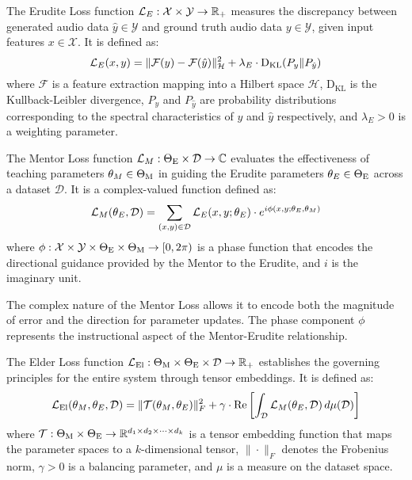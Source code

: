 \begin{definition}
The Erudite Loss function $\mathcal{L}_E: \mathcal{X} \times \mathcal{Y} \rightarrow \mathbb{R}_+$ measures the discrepancy between generated audio data $\hat{y} \in \mathcal{Y}$ and ground truth audio data $y \in \mathcal{Y}$, given input features $x \in \mathcal{X}$. It is defined as:
\begin{equation}
\mathcal{L}_E(x, y) = \| \mathcal{F}(y) - \mathcal{F}(\hat{y}) \|_{\mathcal{H}}^2 + \lambda_E \cdot \mathrm{D_{KL}}(P_y \| P_{\hat{y}})
\end{equation}
where $\mathcal{F}$ is a feature extraction mapping into a Hilbert space $\mathcal{H}$, $\mathrm{D_{KL}}$ is the Kullback-Leibler divergence, $P_y$ and $P_{\hat{y}}$ are probability distributions corresponding to the spectral characteristics of $y$ and $\hat{y}$ respectively, and $\lambda_E > 0$ is a weighting parameter.
\end{definition}

\begin{definition}
The Mentor Loss function $\mathcal{L}_M: \Theta_{\text{E}} \times \mathcal{D} \rightarrow \mathbb{C}$ evaluates the effectiveness of teaching parameters $\theta_M \in \Theta_{\text{M}}$ in guiding the Erudite parameters $\theta_E \in \Theta_{\text{E}}$ across a dataset $\mathcal{D}$. It is a complex-valued function defined as:
\begin{equation}
\mathcal{L}_M(\theta_E, \mathcal{D}) = \sum_{(x,y) \in \mathcal{D}} \mathcal{L}_E(x, y; \theta_E) \cdot e^{i\phi(x,y;\theta_E,\theta_M)}
\end{equation}
where $\phi: \mathcal{X} \times \mathcal{Y} \times \Theta_{\text{E}} \times \Theta_{\text{M}} \rightarrow [0, 2\pi)$ is a phase function that encodes the directional guidance provided by the Mentor to the Erudite, and $i$ is the imaginary unit.
\end{definition}

\begin{remark}
The complex nature of the Mentor Loss allows it to encode both the magnitude of error and the direction for parameter updates. The phase component $\phi$ represents the instructional aspect of the Mentor-Erudite relationship.
\end{remark}

\begin{definition}
The Elder Loss function $\mathcal{L}_{\text{El}}: \Theta_{\text{M}} \times \Theta_{\text{E}} \times \mathcal{D} \rightarrow \mathbb{R}_+$ establishes the governing principles for the entire system through tensor embeddings. It is defined as:
\begin{equation}
\mathcal{L}_{\text{El}}(\theta_M, \theta_E, \mathcal{D}) = \| \mathcal{T}(\theta_M, \theta_E) \|_F^2 + \gamma \cdot \mathrm{Re}\left[\int_{\mathcal{D}} \mathcal{L}_M(\theta_E, \mathcal{D}) \, d\mu(\mathcal{D})\right]
\end{equation}
where $\mathcal{T}: \Theta_{\text{M}} \times \Theta_{\text{E}} \rightarrow \mathbb{R}^{d_1 \times d_2 \times \cdots \times d_k}$ is a tensor embedding function that maps the parameter spaces to a $k$-dimensional tensor, $\|\cdot\|_F$ denotes the Frobenius norm, $\gamma > 0$ is a balancing parameter, and $\mu$ is a measure on the dataset space.
\end{definition}

